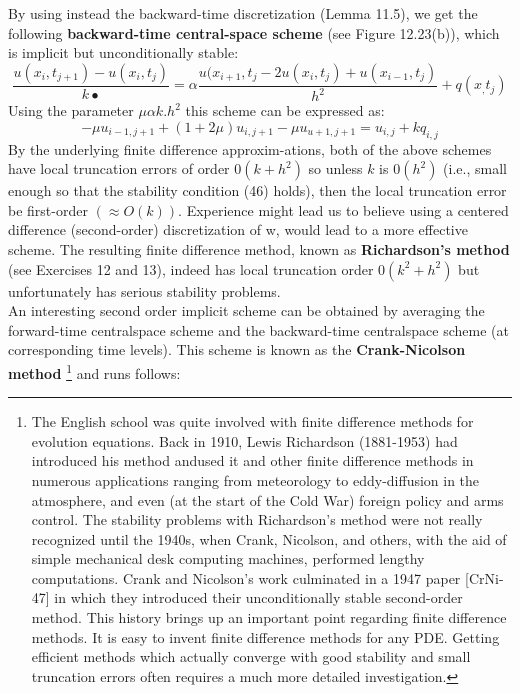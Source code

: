 \documentclass[../main.tex]{subfiles}
\begin{document}
By using instead the backward-time discretization (Lemma 11.5), we get the following \textbf{backward-time central-space scheme} (see Figure 12.23(b)), which is implicit but unconditionally stable:
\begin{equation}
\dfrac{u(x_i,t_{j+1})-u(x_i,t_{j})}{k•}=\alpha 
 \dfrac{u(x_{i+1},t_{j}-2u(x_{i},t_{j})+u(x_{i-1},t_{j})}{h^2}+q(x_,t_j)
\end{equation}
Using the parameter $\mu \alpha k.h^2$ this scheme can be expressed as:
\begin{equation}
-\mu u_{i-1,j+1}+(1+2\mu)u_{i,j+1}-\mu u_{u+1,j+1}=u_{i,j}+kq_{i,j}
\end{equation}
By the underlying finite difference approxim-ations, both of the above schemes have local truncation errors of order $0(k + h^2)$ so unless $k$ is $0(h^2)$ (i.e., small enough so that the stability condition (46) holds), then the local truncation error  be first-order $( \approx O(k))$. Experience might lead us to believe using a centered  difference (second-order) discretization of w, would lead to a more effective scheme. The resulting finite difference method, known as \textbf{Richardson's method} (see Exercises 12 and 13), indeed has local truncation order $0(k^2+h^2)$ but unfortunately has serious stability problems. 
\\%
An interesting second order implicit scheme can be obtained by averaging the forward-time centralspace scheme and the backward-time centralspace scheme (at corresponding time levels). This scheme is known as the \textbf{Crank-Nicolson method}
\footnote{The English school was quite involved with finite difference methods for evolution equations. Back in 1910, Lewis Richardson (1881-1953) had introduced his method andused it and other finite difference methods in numerous applications ranging from meteorology to eddy-diffusion in the atmosphere, and even (at the start of the Cold War) foreign policy and arms control. The stability problems with Richardson's method were not really recognized until the 1940s, when Crank, Nicolson, and others, with the aid of simple mechanical desk computing machines, performed lengthy computations. Crank and Nicolson's work culminated in a 1947 paper [CrNi-47] in which they introduced their unconditionally stable second-order method. This history brings up an important point regarding finite difference methods. It is easy to invent finite difference methods for any PDE. Getting efficient methods which actually converge with good stability and small truncation errors often requires a much more detailed investigation.}
and runs follows:
\end{document}
